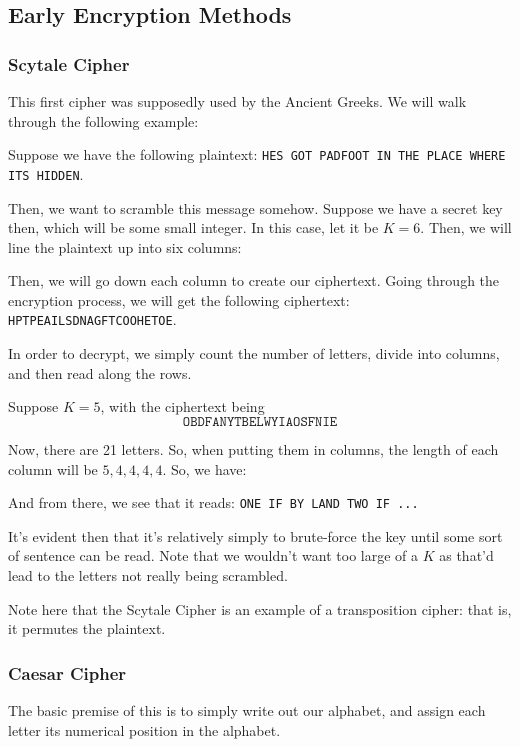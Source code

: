 \documentclass[openany]{book}
\begin{document}
\subsection{Early Encryption Methods}
\subsubsection{Scytale Cipher}
This first cipher was supposedly used by the Ancient Greeks. We will walk through the following example:

\begin{example}
	Suppose we have the following plaintext: \texttt{HES GOT PADFOOT IN THE PLACE WHERE ITS HIDDEN}.
	
	Then, we want to scramble this message somehow. Suppose we have a secret key then, which will be some small integer. In this case, let it be $K = 6$. Then, we will line the plaintext up into six columns:
	
	Then, we will go down each column to create our ciphertext. Going through the encryption process, we will get the following ciphertext: \texttt{HPTPEAILSDNAGFTCOOHETOE}.
\end{example}

In order to decrypt, we simply count the number of letters, divide into columns, and then read along the rows.
\begin{example}
	Suppose $K = 5$, with the ciphertext being
	\begin{equation*}
		\texttt{OBDFANYTBELWYIAOSFNIE}
	\end{equation*}
	
	Now, there are 21 letters. So, when putting them in columns, the length of each column will be $5,4,4,4,4$. So, we have:
	
	And from there, we see that it reads: \texttt{ONE IF BY LAND TWO IF ...}
\end{example}

It's evident then that it's relatively simply to brute-force the key until some sort of sentence can be read. Note that we wouldn't want too large of a $K$ as that'd lead to the letters not really being scrambled.

Note here that the Scytale Cipher is an example of a transposition cipher: that is, it permutes the plaintext.

\subsubsection{Caesar Cipher}
The basic premise of this is to simply write out our alphabet, and assign each letter its numerical position in the alphabet.
\end{document}

